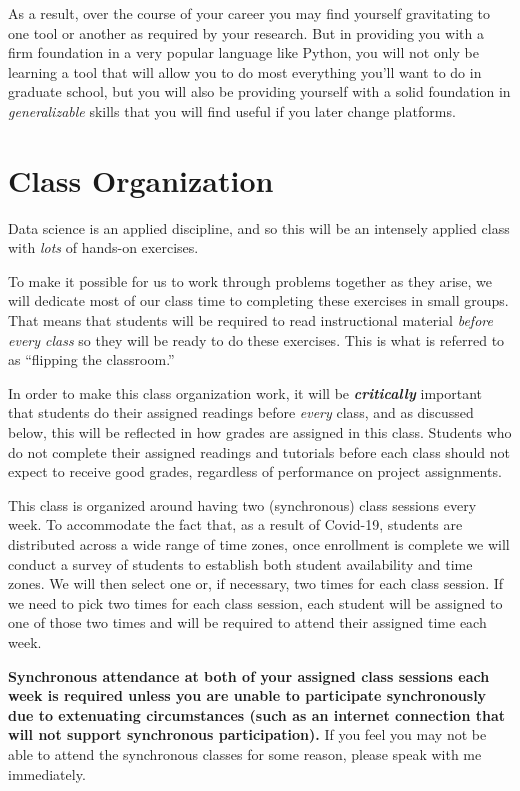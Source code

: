 \documentclass[12pt]{article}
\begin{document}
As a result, over the course of your career you may find yourself gravitating to one tool or another as required by your research. But in providing you with a firm foundation in a very popular language like Python, you will not only be learning a tool that will allow you to do most everything you'll want to do in graduate school, but you will also be providing yourself with a solid foundation in \emph{generalizable} skills that you will find useful if you later change platforms.

\section{Class Organization}

Data science is an applied discipline, and so this will be an intensely applied class with \emph{lots} of hands-on exercises.

To make it possible for us to work through problems together as they arise, we will dedicate most of our class time to completing these exercises in small groups. That means that students will be required to read instructional material \emph{before every class} so they will be ready to do these exercises. This is what is referred to as ``flipping the classroom.''

In order to make this class organization work, it will be \textbf{\emph{critically}} important that students do their assigned readings before \emph{every} class, and as discussed below, this will be reflected in how grades are assigned in this class. Students who do not complete their assigned readings and tutorials before each class should not expect to receive good grades, regardless of performance on project assignments.

This class is organized around having two (synchronous) class sessions every week. To accommodate the fact that, as a result of Covid-19, students are distributed across a wide range of time zones, once enrollment is complete we will conduct a survey of students to establish both student availability and time zones.  We will then select one or, if necessary, two times for each class session. If we need to pick two times for each class session, each student will be assigned to one of those two times and will be required to attend their assigned time each week.

\textbf{Synchronous attendance at both of your assigned class sessions each week is required unless you are unable to participate synchronously due to extenuating circumstances (such as an internet connection that will not support synchronous participation).} If you feel you may not be able to attend the synchronous classes for some reason, please speak with me immediately.
\end{document}
